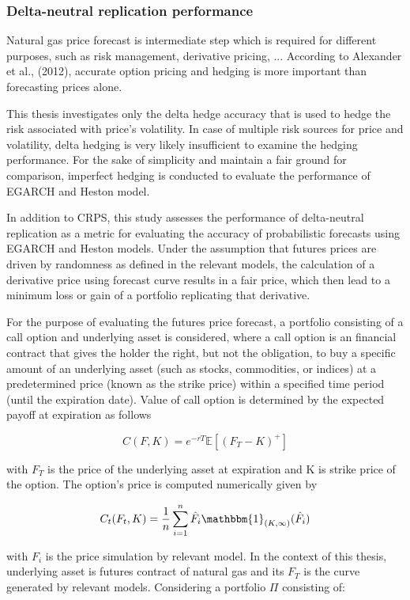 \documentclass[12pt,a4paper]{article}
\numberwithin{equation}{section}
\begin{document}
\subsubsection{Delta-neutral replication performance}

Natural gas price forecast is intermediate step which is required for different purposes, such as risk management, derivative pricing, ... According to Alexander et al., (2012), accurate option pricing and hedging is more important than forecasting prices alone. 

This thesis investigates only the delta hedge accuracy that is used to hedge the risk associated with price's volatility. In case of multiple risk sources for price and volatility, delta hedging is very likely insufficient to examine the hedging performance. For the sake of simplicity and maintain a fair ground for comparison, imperfect hedging is conducted to evaluate the performance of EGARCH and Heston model. 

In addition to CRPS, this study assesses the performance of delta-neutral replication as a metric for evaluating the accuracy of probabilistic forecasts using EGARCH and Heston models. Under the assumption that futures prices are driven by randomness as defined in the relevant models, the calculation of a derivative price using forecast curve results in a fair price, which then lead to a minimum loss or gain of a portfolio replicating that derivative. 

For the purpose of evaluating the futures price forecast, a portfolio consisting of a call option and underlying asset is considered, where a call option is an financial contract that gives the holder the right, but not the obligation, to buy a specific amount of an underlying asset (such as stocks, commodities, or indices) at a predetermined price (known as the strike price) within a specified time period (until the expiration date). Value of call option is determined by the expected payoff at expiration as follows

\[C(F, K) = e^{-rT} \mathbb{E} \left[(F_T - K)^+ \right] \]

with $F_T$ is the price of the underlying asset at expiration and K is strike price of the option. The option's price is computed numerically given by

\[C_t(F_t, K) = \frac{1}{n} \sum_{i=1}^n \hat{F}_i \mathbbm{1}_{(K, \infty)}(\hat{F}_i) \]

with $F_i$ is the price simulation by relevant model.
In the context of this thesis, underlying asset is futures contract of natural gas and its $F_T$ is the curve generated by relevant models. Considering a portfolio $\Pi$ consisting of: 
\end{document}
